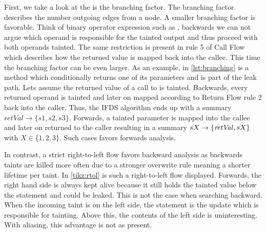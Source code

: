 \documentclass[../draft.tex]{subfiles}
\begin{document}
    First, we take a look at the is the branching factor. The branching factor describes the number outgoing edges from a node. A smaller branching factor is favorable.   
    Think of binary operator expression such as , backwards we can not argue which operand is responsible for the tainted output and thus proceed with both operands tainted. The same restriction is present in rule 5 of Call Flow which describes how the returned value is mapped back into the callee. This time the branching factor can be even larger. As an example, in \autoref{lst:branching} is a method which conditionally returns one of its parameters and is part of the leak path. Lets assume the returned value of a call to  is tainted. Backwards, every returned operand is tainted and later on mapped according to Return Flow rule 2 back into the caller. Thus, the IFDS algorithm ends up with a summary $\mathit{retVal} \rightarrow \{s1, s2, s3\}$. Forwards, a tainted parameter is mapped into the callee and later on returned to the caller resulting in a summary $sX \rightarrow \mathit\{\mathit{retVal}, sX\}$ with $X \in \{1,2,3\}$. Such cases favors forwards analysis.

    In contrast, a strict right-to-left flow favors backward analysis as backwards taints are killed more often due to a stronger overwrite rule meaning a shorter lifetime per taint. In \autoref{tikz:rtol} is such a right-to-left flow displayed. Forwards, the right hand side is always kept alive because it still holds the tainted value below the statement and could be leaked. 
    This is not the case when searching backward. When the incoming taint is on the left side, the statement is the update which is responsible for tainting. Above this, the contents of the left side is uninteresting. With aliasing, this advantage is not as present.
\end{document}
